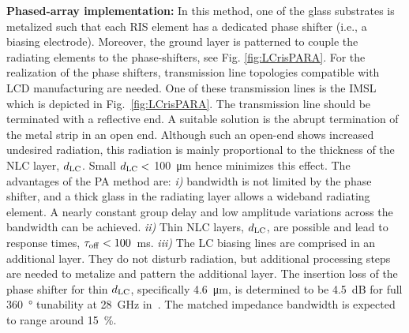 \textbf{Phased-array implementation:} In this method, one of the glass substrates is metalized such that each \gls{RIS} element has a dedicated phase shifter (i.e., a biasing electrode). Moreover, the ground layer is patterned to couple the radiating elements to the phase-shifters, see Fig. \ref{fig:LCrisPARA}. For the realization of the phase shifters, transmission line topologies compatible with \gls{LCD} manufacturing are needed.
One of these transmission lines is the \gls{IMSL} which is depicted in Fig.~\ref{fig:LCrisPARA}. 
The transmission line should be terminated with a reflective end. %
A suitable solution is the abrupt termination of the metal strip in an open end. 
Although such an open-end shows increased undesired radiation, this radiation is mainly proportional to the thickness of the \gls{NLC} layer, $d_{\rm LC}$. 
Small $d_{\rm LC} <\ $\SI{100}{\micro\meter} hence minimizes this effect.
The advantages of the \gls{PA} method are: \textit{i)} bandwidth is not limited by the phase shifter, and a thick glass in the radiating layer allows a wideband radiating element. A nearly constant group delay and low amplitude variations across the bandwidth can be achieved. 
\textit{ii)} Thin \gls{NLC} layers, $d_{\rm LC}$, are possible and lead to response times, $\tau_{\rm off}<100$~ms.
\textit{iii)} The LC biasing lines are comprised in an additional layer. They do not disturb radiation, but additional processing steps are needed to metalize and pattern the additional layer. The insertion loss of the phase shifter for thin $d_{\rm LC}$, specifically \SI{4.6}{\micro\meter}, is determined to be \SI{4.5}{\dB} for full \SI{360}{\degree} tunability at \SI{28}{\GHz} in~\cite{neuder2023compact}. The matched impedance bandwidth is expected to range around \SI{15}{\percent}. 

